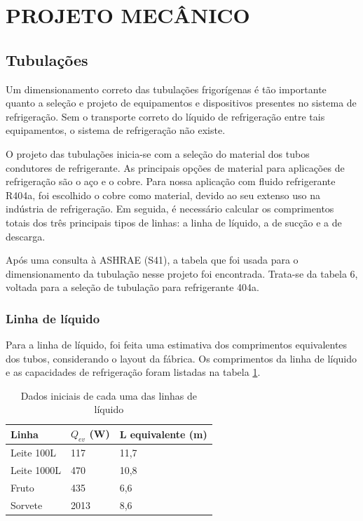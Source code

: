 \documentclass[10pt,a4paper]{article}
\begin{document}
\clearpage

\section{{ PROJETO MECÂNICO}}

\subsection{{Tubulações}}

Um dimensionamento correto das tubulações frigorígenas é tão importante quanto a seleção e projeto de equipamentos e dispositivos presentes no sistema de refrigeração. Sem o transporte correto do líquido de refrigeração entre tais equipamentos, o sistema de refrigeração não existe.

O projeto das tubulações inicia-se com a seleção do material dos tubos condutores de refrigerante. As principais opções de material para aplicações de refrigeração são o aço e o cobre. Para nossa aplicação com fluido refrigerante R404a, foi escolhido o cobre como material, devido ao seu extenso uso na indústria de refrigeração. Em seguida, é necessário calcular os comprimentos totais dos três principais tipos de linhas: a linha de líquido, a de sucção e a de descarga.

Após uma consulta à ASHRAE (S41), a tabela que foi usada para o dimensionamento da tubulação nesse projeto foi encontrada. Trata-se da tabela 6, voltada para a seleção de tubulação para refrigerante 404a.

\subsubsection{{Linha de líquido}}

Para a linha de líquido, foi feita uma estimativa dos comprimentos equivalentes dos tubos, considerando o layout da fábrica. Os comprimentos da linha de líquido e as capacidades de refrigeração foram listadas na tabela \ref{tab linhaliq}. 

\begin{table}[h]
\centering
\caption{Dados iniciais de cada uma das linhas de líquido}
\begin{tabular}{|l|l|l|}
\hline
Linha & $Q_{ev}$ (W) & L equivalente (m) \\ \hline
Leite 100L     & 117     & 11,7              \\ \hline
Leite 1000L     & 470     & 10,8              \\ \hline
Fruto     & 435     & 6,6               \\ \hline
Sorvete     & 2013    & 8,6               \\ \hline
\end{tabular}
\label{tab linhaliq}
\end{table}
\end{document}
